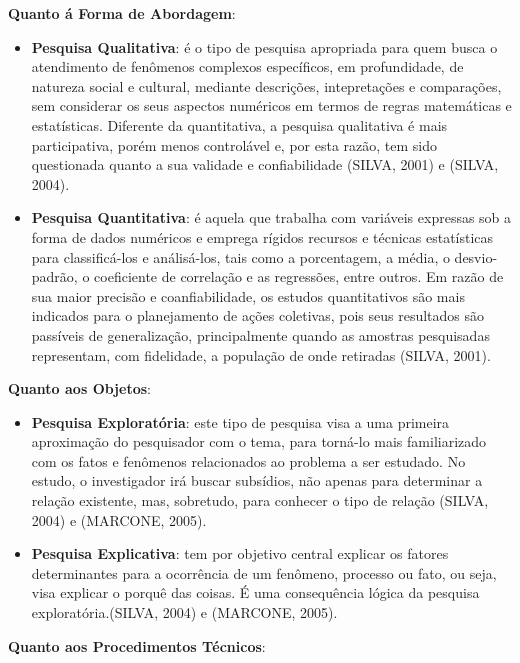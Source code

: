 \textbf{Quanto á Forma de Abordagem}: 

\begin{itemize}
\item \textbf{Pesquisa Qualitativa}: é o tipo de pesquisa apropriada para quem busca o atendimento de fenômenos complexos específicos, em profundidade, de natureza social e cultural, mediante descrições, intepretações e comparações, sem considerar os seus aspectos numéricos em termos de regras matemáticas e estatísticas. Diferente da quantitativa, a pesquisa qualitativa é mais participativa, porém menos controlável e, por esta razão, tem sido questionada quanto a sua validade e confiabilidade (SILVA, 2001) e (SILVA, 2004).
\item \textbf{Pesquisa Quantitativa}: é aquela que trabalha com variáveis expressas sob a forma de dados numéricos e emprega rígidos recursos e técnicas estatísticas para classificá-los e análisá-los, tais como a porcentagem, a média, o desvio-padrão, o coeficiente de correlação e as regressões, entre outros. Em razão de sua maior precisão e coanfiabilidade, os estudos quantitativos são mais indicados para o planejamento de ações coletivas, pois seus resultados são passíveis de generalização, principalmente quando as amostras pesquisadas representam, com fidelidade, a população de onde retiradas (SILVA, 2001).
\end{itemize}


\textbf{Quanto aos Objetos}: 

\begin{itemize}
\item \textbf{Pesquisa Exploratória}: este tipo de pesquisa visa a uma primeira aproximação do pesquisador com o tema, para torná-lo mais familiarizado com os fatos e fenômenos relacionados ao problema a ser estudado. No estudo, o investigador irá buscar subsídios, não apenas para determinar a relação existente, mas, sobretudo, para conhecer o tipo de relação (SILVA, 2004) e (MARCONE, 2005).
\item \textbf{Pesquisa Explicativa}: tem por objetivo central explicar os fatores determinantes para a ocorrência de um fenômeno, processo ou fato, ou seja, visa explicar o porquê das coisas. É uma consequência lógica da pesquisa exploratória.(SILVA, 2004) e (MARCONE, 2005).
\end{itemize}


\textbf{Quanto aos Procedimentos Técnicos}: 

